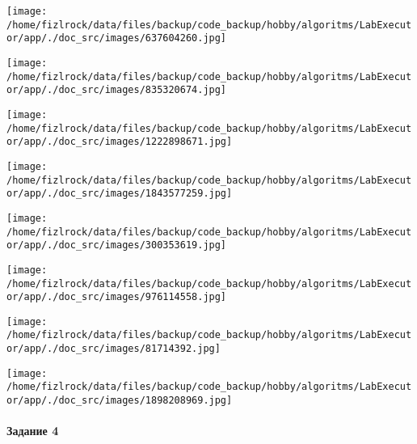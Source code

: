 \documentclass[a4paper, 12pt]{article}
\begin{document}
\texttt{[image: /home/fizlrock/data/files/backup/code\_backup/hobby/algoritms/LabExecutor/app/./doc\_src/images/637604260.jpg]}

\texttt{[image: /home/fizlrock/data/files/backup/code\_backup/hobby/algoritms/LabExecutor/app/./doc\_src/images/835320674.jpg]}

\texttt{[image: /home/fizlrock/data/files/backup/code\_backup/hobby/algoritms/LabExecutor/app/./doc\_src/images/1222898671.jpg]}

\texttt{[image: /home/fizlrock/data/files/backup/code\_backup/hobby/algoritms/LabExecutor/app/./doc\_src/images/1843577259.jpg]}

\texttt{[image: /home/fizlrock/data/files/backup/code\_backup/hobby/algoritms/LabExecutor/app/./doc\_src/images/300353619.jpg]}

\texttt{[image: /home/fizlrock/data/files/backup/code\_backup/hobby/algoritms/LabExecutor/app/./doc\_src/images/976114558.jpg]}

\texttt{[image: /home/fizlrock/data/files/backup/code\_backup/hobby/algoritms/LabExecutor/app/./doc\_src/images/81714392.jpg]}

\texttt{[image: /home/fizlrock/data/files/backup/code\_backup/hobby/algoritms/LabExecutor/app/./doc\_src/images/1898208969.jpg]}
\pagebreak
\paragraph{Задание 4}
\end{document}
